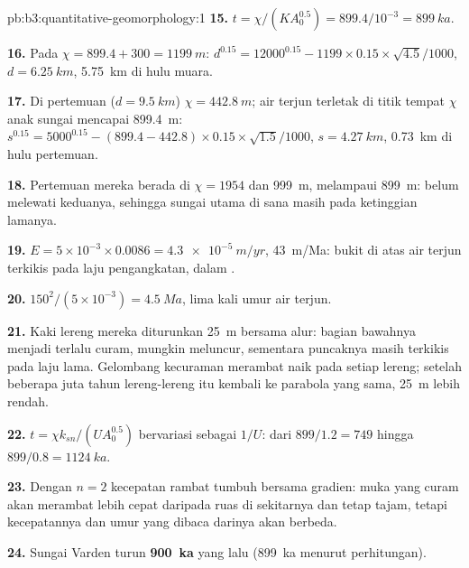 \begin{solution}{pb:b3:quantitative-geomorphology:1}
\textbf{15.} $t = \chi/(KA_0^{0.5}) = 899.4/10^{-3} = \qty{899}{ka}$.

\textbf{16.} Pada $\chi = 899.4 + 300 = \qty{1199}{m}$:
$d^{0.15} = 12000^{0.15} - 1199\times0.15\times\sqrt{4.5}/1000$, $d =
\qty{6.25}{km}$, \qty{5.75}{km} di hulu muara.

\textbf{17.} Di pertemuan ($d = \qty{9.5}{km}$) $\chi = \qty{442.8}{m}$;
air terjun terletak di titik tempat $\chi$ anak sungai mencapai \qty{899.4}{m}:
$s^{0.15} = 5000^{0.15} - (899.4 - 442.8)\times0.15\times\sqrt{1.5}/1000$,
$s = \qty{4.27}{km}$, \qty{0.73}{km} di hulu pertemuan.

\textbf{18.} Pertemuan mereka berada di $\chi = 1954$ dan \qty{999}{m}, melampaui
\qty{899}{m}:  belum melewati keduanya, sehingga sungai utama di sana
masih pada ketinggian lamanya.

\textbf{19.} $E = 5\times10^{-3}\times0.0086 = \qty{4.3e-5}{m/yr}$,
\qty{43}{m/Ma}: bukit di atas air terjun terkikis pada laju pengangkatan, dalam
.

\textbf{20.} $150^2/(5\times10^{-3}) = \qty{4.5}{Ma}$, lima kali umur
air terjun.

\textbf{21.} Kaki lereng mereka diturunkan \qty{25}{m} bersama alur:
bagian bawahnya menjadi terlalu curam, mungkin meluncur, sementara puncaknya masih
terkikis pada laju lama. Gelombang kecuraman merambat naik pada setiap lereng; setelah beberapa
juta tahun lereng-lereng itu kembali ke parabola yang sama, \qty{25}{m} lebih rendah.

\textbf{22.} $t = \chi k_{sn}/(U A_0^{0.5})$ bervariasi sebagai $1/U$: dari
$899/1.2 = 749$ hingga $899/0.8 = \qty{1124}{ka}$.

\textbf{23.} Dengan $n = 2$ kecepatan rambat tumbuh bersama gradien: muka
yang curam akan merambat lebih cepat daripada ruas di sekitarnya dan tetap tajam, tetapi
kecepatannya dan umur yang dibaca darinya akan berbeda.

\textbf{24.}  Sungai Varden turun
\textbf{\qty[text-series-to-math=true]{900}{ka}} yang lalu (\qty{899}{ka} menurut
perhitungan).
\end{solution}
